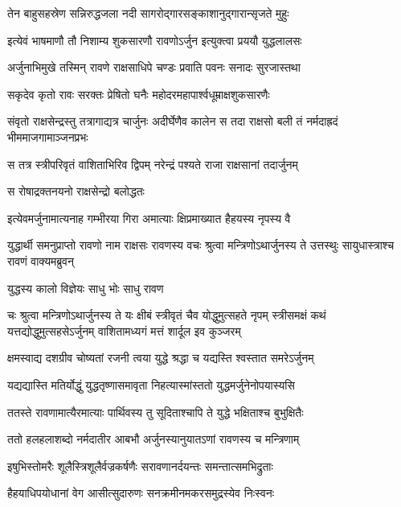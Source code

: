 \twolineshloka
{तेन बाहुसहस्रेण सन्निरुद्धजला नदी}
{सागरोद्गारसङ्काशानुद्गारान्सृजते मुहुः} %

\twolineshloka
{इत्येवं भाषमाणौ तौ निशाम्य शुकसारणौ}
{रावणोऽर्जुन इत्युक्त्वा प्रययौ युद्धलालसः} %

\twolineshloka
{अर्जुनाभिमुखे तस्मिन् रावणे राक्षसाधिपे}
{चण्डः प्रवाति पवनः सनादः सुरजास्तथा} %

\twolineshloka
{सकृदेव कृतो रावः सरक्तः प्रेषितो घनैः}
{महोदरमहापार्श्वधूम्राक्षशुकसारणैः} %

\threelineshloka
{संवृतो राक्षसेन्द्रस्तु तत्रागाद्यत्र चार्जुनः}
{अदीर्घेणैव कालेन स तदा राक्षसो बली}
{तं नर्मदाह्रदं भीममाजगामाञ्जनप्रभः} %

\twolineshloka
{स तत्र स्त्रीपरिवृतं वाशिताभिरिव द्विपम्}
{नरेन्द्रं पश्यते राजा राक्षसानां तदार्जुनम्} %

\onelineshloka
{स रोषाद्रक्तनयनो राक्षसेन्द्रो बलोद्धतः} %

\twolineshloka
{इत्येवमर्जुनामात्यनाह गम्भीरया गिरा}
{अमात्याः क्षिप्रमाख्यात हैहयस्य नृपस्य वै} %

\threelineshloka
{युद्धार्थी समनुप्राप्तो रावणो नाम राक्षसः}
{रावणस्य वचः श्रुत्वा मन्त्रिणोऽथार्जुनस्य ते}
{उत्तस्थुः सायुधास्त्राश्च रावणं वाक्यमब्रुवन्} %

\onelineshloka
{युद्धस्य कालो विज्ञेयः साधु भोः साधु रावण} %

\fourlineindentedshloka
{चः श्रुत्वा मन्त्रिणोऽथार्जुनस्य ते}
{यः क्षीबं स्त्रीवृतं चैव योद्धुमुत्सहते नृपम्}
{स्त्रीसमक्षं कथं यत्तद्योद्धुमुत्सहसेऽर्जुनम्}
{वाशितामध्यगं मत्तं शार्दूल इव कुञ्जरम्} %

\twolineshloka
{क्षमस्वाद्य दशग्रीव चोष्यतां रजनी त्वया}
{युद्धे श्रद्धा च यद्यस्ति श्वस्तात समरेऽर्जुनम्} %

\twolineshloka
{यद्यद्यास्ति मतिर्योद्धुं युद्धतृष्णासमावृता}
{निहत्यास्मांस्ततो युद्धमर्जुनेनोपयास्यसि} %

\twolineshloka
{ततस्ते रावणामात्यैरमात्याः पार्थिवस्य तु}
{सूदिताश्चापि ते युद्धे भक्षिताश्च बुभुक्षितैः} %

\twolineshloka
{ततो हलहलाशब्दो नर्मदातीर आबभौ}
{अर्जुनस्यानुयातऽणां रावणस्य च मन्त्रिणाम्} %

\twolineshloka
{इषुभिस्तोमरैः शूलैस्त्रिशूलैर्वज्रकर्षणैः}
{सरावणानर्दयन्तः समन्तात्समभिद्रुताः} %

\twolineshloka
{हैहयाधिपयोधानां वेग आसीत्सुदारुणः}
{सनक्रमीनमकरसमुद्रस्येव निःस्वनः} %

